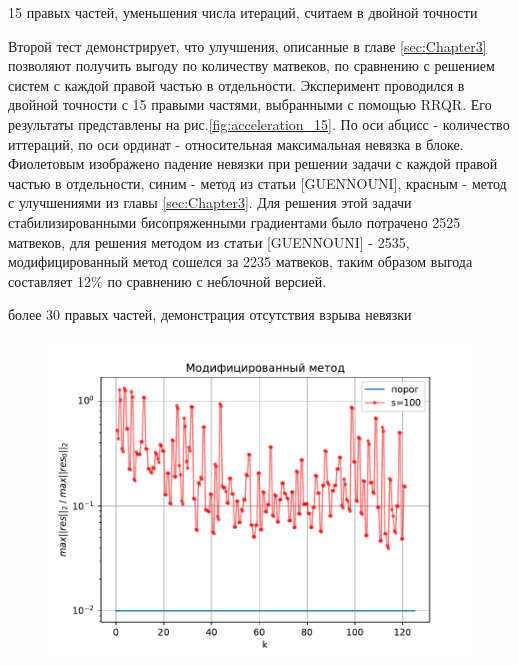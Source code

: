\par 15 правых частей, уменьшения числа итераций, считаем в двойной точности
\par Второй тест демонстрирует, что улучшения, описанные в главе \ref{sec:Chapter3} позволяют получить выгоду по количеству матвеков,
по сравнению с решением систем с каждой правой частью в отдельности. Эксперимент проводился в двойной точности с 15 правыми частями,
выбранными с помощью RRQR. Его результаты представлены на рис.\ref{fig:acceleration_15}. По оси абцисс - количество иттераций, по оси
ординат - относительная максимальная невязка в блоке. Фиолетовым изображено падение невязки при решении задачи с каждой правой частью 
в отдельности, синим - метод из статьи [GUENNOUNI], красным - метод с улучшениями из главы \ref{sec:Chapter3}. Для решения этой задачи
стабилизированными бисопряженными градиентами было потрачено 2525 матвеков, для решения методом из статьи [GUENNOUNI] - 2535, модифицированный
метод сошелся за 2235 матвеков, таким образом выгода составляет 12\% по сравнению с неблочной версией.
\par более 30 правых частей, демонстрация отсутствия взрыва невязки
\begin{figure}[H]
    \centering
    \includegraphics[width=0.7\linewidth]{images/100_rhs.pdf}
    \caption{}
    \label{fig:100_rhs}
\end{figure}

\newpage
